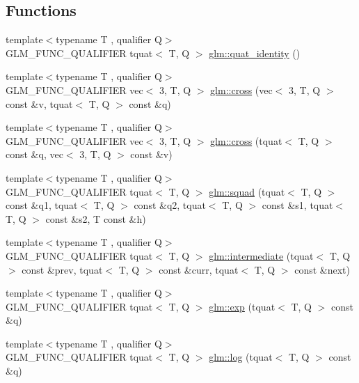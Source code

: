 \subsection*{Functions}
\begin{DoxyCompactItemize}
\item 
{\footnotesize template$<$typename T , qualifier Q$>$ }\\G\+L\+M\+\_\+\+F\+U\+N\+C\+\_\+\+Q\+U\+A\+L\+I\+F\+I\+ER tquat$<$ T, Q $>$ \hyperlink{group__gtx__quaternion_ga40788ce1d74fac29fa000af893a3ceb5}{glm\+::quat\+\_\+identity} ()
\item 
{\footnotesize template$<$typename T , qualifier Q$>$ }\\G\+L\+M\+\_\+\+F\+U\+N\+C\+\_\+\+Q\+U\+A\+L\+I\+F\+I\+ER vec$<$ 3, T, Q $>$ \hyperlink{group__gtx__quaternion_gaa75ca5654e0dc3b61c05db091f7d46ce}{glm\+::cross} (vec$<$ 3, T, Q $>$ const \&v, tquat$<$ T, Q $>$ const \&q)
\item 
{\footnotesize template$<$typename T , qualifier Q$>$ }\\G\+L\+M\+\_\+\+F\+U\+N\+C\+\_\+\+Q\+U\+A\+L\+I\+F\+I\+ER vec$<$ 3, T, Q $>$ \hyperlink{group__gtx__quaternion_ga8639615408166d0dddda1b91a940b338}{glm\+::cross} (tquat$<$ T, Q $>$ const \&q, vec$<$ 3, T, Q $>$ const \&v)
\item 
{\footnotesize template$<$typename T , qualifier Q$>$ }\\G\+L\+M\+\_\+\+F\+U\+N\+C\+\_\+\+Q\+U\+A\+L\+I\+F\+I\+ER tquat$<$ T, Q $>$ \hyperlink{group__gtx__quaternion_gacfcb16619e166e672c4672aff50a565c}{glm\+::squad} (tquat$<$ T, Q $>$ const \&q1, tquat$<$ T, Q $>$ const \&q2, tquat$<$ T, Q $>$ const \&s1, tquat$<$ T, Q $>$ const \&s2, T const \&h)
\item 
{\footnotesize template$<$typename T , qualifier Q$>$ }\\G\+L\+M\+\_\+\+F\+U\+N\+C\+\_\+\+Q\+U\+A\+L\+I\+F\+I\+ER tquat$<$ T, Q $>$ \hyperlink{group__gtx__quaternion_gac9be2084562a52ae8923813233563a28}{glm\+::intermediate} (tquat$<$ T, Q $>$ const \&prev, tquat$<$ T, Q $>$ const \&curr, tquat$<$ T, Q $>$ const \&next)
\item 
{\footnotesize template$<$typename T , qualifier Q$>$ }\\G\+L\+M\+\_\+\+F\+U\+N\+C\+\_\+\+Q\+U\+A\+L\+I\+F\+I\+ER tquat$<$ T, Q $>$ \hyperlink{group__gtx__quaternion_ga72275e87ce62dc75a06d39a6c049835c}{glm\+::exp} (tquat$<$ T, Q $>$ const \&q)
\item 
{\footnotesize template$<$typename T , qualifier Q$>$ }\\G\+L\+M\+\_\+\+F\+U\+N\+C\+\_\+\+Q\+U\+A\+L\+I\+F\+I\+ER tquat$<$ T, Q $>$ \hyperlink{group__gtx__quaternion_gaad510f1a4ea26994b341c094ec4f4eed}{glm\+::log} (tquat$<$ T, Q $>$ const \&q)

\end{DoxyCompactItemize}
